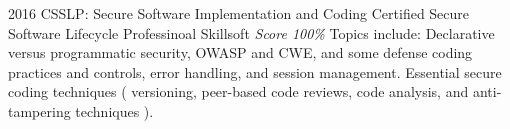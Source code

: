 \documentclass[11pt,a4paper]{moderncv}
\begin{document}
\cventry                                                          %
    {2016}                                                          %
    {CSSLP: Secure Software Implementation and Coding}                                                          %
    {Certified Secure Software Lifecycle Professinoal}                                                          %
    {Skillsoft}                                                          %
    {\textit{Score 100\%}}                                                          %
    {                                                          %
        Topics include:                                                          %
            Declarative versus programmatic security,                            %
            OWASP and CWE,                                                       %
            and some defense coding practices and controls,                      %
            error handling,                                                      %
            and session management.                                              %
            Essential secure coding techniques (                                 %
                versioning,                                                      %
                peer-based code reviews,                                         %
                code analysis,                                                   %
                and anti-tampering techniques                                    %
            ).                                                                   %
    }                                                          %
\end{document}
